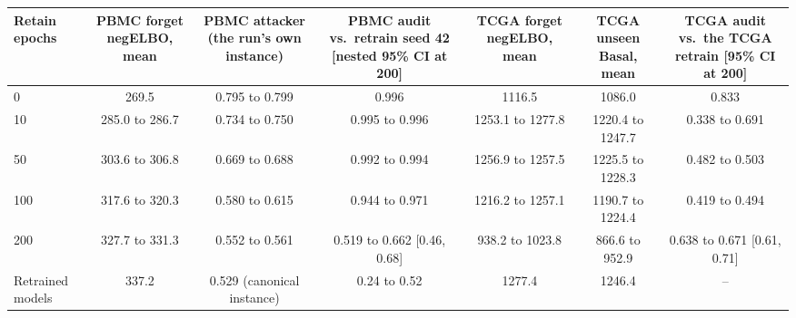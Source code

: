 \begin{tabular}{lcccccc}
\toprule
Retain epochs & PBMC forget negELBO, mean & PBMC attacker (the run's own instance) & PBMC audit vs.\ retrain seed 42 [nested 95\% CI at 200] & TCGA forget negELBO, mean & TCGA unseen Basal, mean & TCGA audit vs.\ the TCGA retrain [95\% CI at 200] \\
\midrule
0 & 269.5 & 0.795 to 0.799 & 0.996 & 1116.5 & 1086.0 & 0.833 \\
10 & 285.0 to 286.7 & 0.734 to 0.750 & 0.995 to 0.996 & 1253.1 to 1277.8 & 1220.4 to 1247.7 & 0.338 to 0.691 \\
50 & 303.6 to 306.8 & 0.669 to 0.688 & 0.992 to 0.994 & 1256.9 to 1257.5 & 1225.5 to 1228.3 & 0.482 to 0.503 \\
100 & 317.6 to 320.3 & 0.580 to 0.615 & 0.944 to 0.971 & 1216.2 to 1257.1 & 1190.7 to 1224.4 & 0.419 to 0.494 \\
200 & 327.7 to 331.3 & 0.552 to 0.561 & 0.519 to 0.662 [0.46, 0.68] & 938.2 to 1023.8 & 866.6 to 952.9 & 0.638 to 0.671 [0.61, 0.71] \\
\midrule
Retrained models & 337.2 & 0.529 (canonical instance) & 0.24 to 0.52 & 1277.4 & 1246.4 & -- \\
\bottomrule
\end{tabular}
